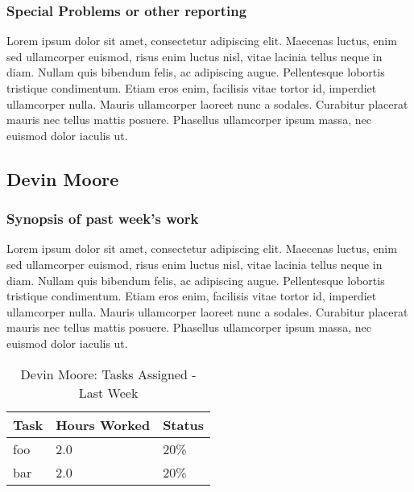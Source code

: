 \documentclass[12pt,journal,compsoc]{IEEEtran}
\begin{document}
\subsubsection*{Special Problems or other reporting}
Lorem ipsum dolor sit amet, consectetur adipiscing elit. Maecenas luctus, enim sed ullamcorper euismod, risus enim luctus nisl, vitae lacinia tellus neque in diam. Nullam quis bibendum felis, ac adipiscing augue. Pellentesque lobortis tristique condimentum. Etiam eros enim, facilisis vitae tortor id, imperdiet ullamcorper nulla. Mauris ullamcorper laoreet nunc a sodales. Curabitur placerat mauris nec tellus mattis posuere. Phasellus ullamcorper ipsum massa, nec euismod dolor iaculis ut.

\subsection{Devin Moore}

\subsubsection*{Synopsis of past week's work}

Lorem ipsum dolor sit amet, consectetur adipiscing elit. Maecenas luctus, enim sed ullamcorper euismod, risus enim luctus nisl, vitae lacinia tellus neque in diam. Nullam quis bibendum felis, ac adipiscing augue. Pellentesque lobortis tristique condimentum. Etiam eros enim, facilisis vitae tortor id, imperdiet ullamcorper nulla. Mauris ullamcorper laoreet nunc a sodales. Curabitur placerat mauris nec tellus mattis posuere. Phasellus ullamcorper ipsum massa, nec euismod dolor iaculis ut.


\begin{table}[ht]
\renewcommand{\arraystretch}{1.3}
	\caption{Devin Moore: Tasks Assigned - Last Week}
	
	\label{Summary of Devin Moore's activities: last week}
	
	\centering
	
	\begin{tabular}{p{5.5cm}|p{1cm}|p{1cm}}

	\hline
	\bfseries 	Task		 		& \bfseries Hours Worked	& \bfseries Status	\\
	\hline
	\hline
				foo					& 2.0						& 20\%				\\	%
				bar					& 2.0						& 20\%				\\	
	\hline
	\end{tabular}
\end{table}
\end{document}
